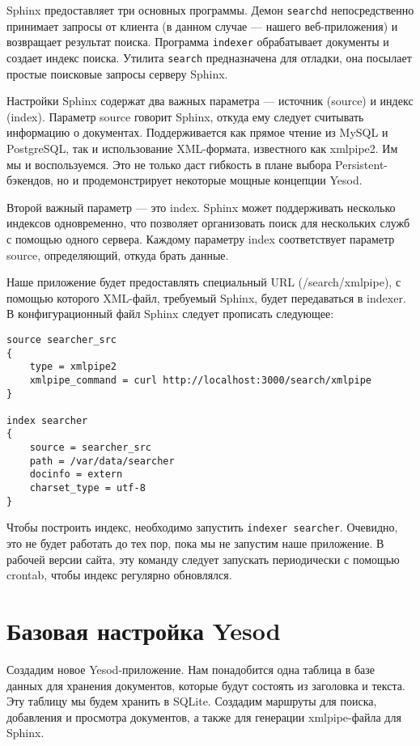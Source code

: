 Sphinx предоставляет три основных программы. Демон \lstinline!searchd! непосредственно принимает запросы от клиента (в данном случае --- нашего веб-приложения) и возвращает результат поиска. Программа \lstinline!indexer! обрабатывает документы и создает индекс поиска. Утилита \lstinline!search! предназначена для отладки, она посылает простые поисковые запросы серверу Sphinx.

Настройки Sphinx содержат два важных параметра --- источник (source) и индекс (index). Параметр source говорит Sphinx, откуда ему следует считывать информацию о документах. Поддерживается как прямое чтение из MySQL и PostgreSQL, так и использование XML-формата, известного как xmlpipe2. Им мы и воспользуемся. Это не только даст гибкость в плане выбора Persistent-бэкендов, но и продемонстрирует некоторые мощные концепции Yesod.

Второй важный параметр --- это index. Sphinx может поддерживать несколько индексов одновременно, что позволяет организовать поиск для нескольких служб с помощью одного сервера. Каждому параметру index соответствует параметр source, определяющий, откуда брать данные.

Наше приложение будет предоставлять специальный URL (/search/xmlpipe), с помощью которого XML-файл, требуемый Sphinx, будет передаваться в indexer. В конфигурационный файл Sphinx следует прописать следующее:

\begin{lstlisting}
source searcher_src
{
    type = xmlpipe2
    xmlpipe_command = curl http://localhost:3000/search/xmlpipe
}

index searcher
{
    source = searcher_src
    path = /var/data/searcher
    docinfo = extern
    charset_type = utf-8
}
\end{lstlisting}

Чтобы построить индекс, необходимо запустить \lstinline!indexer searcher!. Очевидно, это не будет работать до тех пор, пока мы не запустим наше приложение.  В рабочей версии сайта, эту команду следует запускать периодически с помощью crontab, чтобы индекс регулярно обновлялся.

\section{Базовая настройка Yesod} %

Создадим новое Yesod-приложение. Нам понадобится одна таблица в базе данных для хранения документов, которые будут состоять из заголовка и текста. Эту таблицу мы будем хранить в SQLite. Создадим маршруты для поиска, добавления и просмотра документов, а также для генерации xmlpipe-файла для Sphinx.

